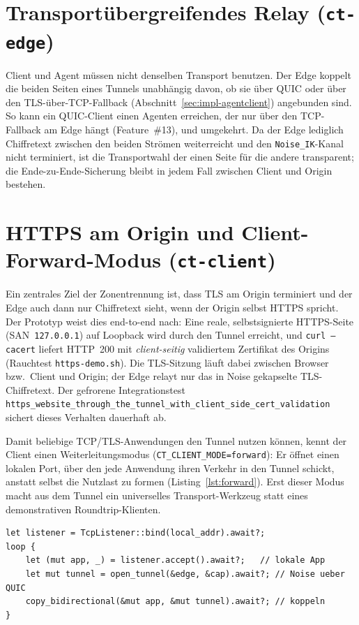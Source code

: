\section{Transportübergreifendes Relay (\texttt{ct-edge})}
\label{sec:impl-crosstransport}

Client und Agent müssen nicht denselben Transport benutzen. Der Edge koppelt
die beiden Seiten eines Tunnels unabhängig davon, ob sie über QUIC oder über
den TLS-über-TCP-Fallback (Abschnitt~\ref{sec:impl-agentclient}) angebunden
sind. So kann ein QUIC-Client einen Agenten erreichen, der nur über den
TCP-Fallback am Edge hängt (Feature~\#13), und umgekehrt. Da der Edge lediglich
Chiffretext zwischen den beiden Strömen weiterreicht und den
\texttt{Noise\_IK}-Kanal nicht terminiert, ist die Transportwahl der einen Seite
für die andere transparent; die Ende-zu-Ende-Sicherung bleibt in jedem Fall
zwischen Client und Origin bestehen.

\section{HTTPS am Origin und Client-Forward-Modus (\texttt{ct-client})}
\label{sec:impl-https}

Ein zentrales Ziel der Zonentrennung ist, dass TLS am Origin terminiert und der
Edge auch dann nur Chiffretext sieht, wenn der Origin selbst HTTPS spricht. Der
Prototyp weist dies end-to-end nach: Eine reale, selbstsignierte HTTPS-Seite
(SAN~\texttt{127.0.0.1}) auf Loopback wird durch den Tunnel erreicht, und
\texttt{curl\ --cacert} liefert HTTP~200 mit \emph{client-seitig} validiertem
Zertifikat des Origins (Rauchtest \texttt{https-demo.sh}). Die TLS-Sitzung
läuft dabei zwischen Browser bzw.\ Client und Origin; der Edge relayt nur das
in Noise gekapselte TLS-Chiffretext. Der gefrorene Integrationstest
\texttt{https\_website\_through\_the\_tunnel\_with\_client\_side\_cert\_validation}
sichert dieses Verhalten dauerhaft ab.

Damit beliebige TCP/TLS-Anwendungen den Tunnel nutzen können, kennt der Client
einen Weiterleitungsmodus (\texttt{CT\_CLIENT\_MODE=forward}): Er öffnet einen
lokalen Port, über den jede Anwendung ihren Verkehr in den Tunnel schickt,
anstatt selbst die Nutzlast zu formen (Listing~\ref{lst:forward}). Erst dieser
Modus macht aus dem Tunnel ein universelles Transport-Werkzeug statt eines
demonstrativen Roundtrip-Klienten.

\begin{lstlisting}[caption={Client-Forward-Modus: lokaler Port in den Tunnel (gekürzt, \texttt{ct-client}).},label={lst:forward}]
let listener = TcpListener::bind(local_addr).await?;
loop {
    let (mut app, _) = listener.accept().await?;   // lokale App
    let mut tunnel = open_tunnel(&edge, &cap).await?; // Noise ueber QUIC
    copy_bidirectional(&mut app, &mut tunnel).await?; // koppeln
}
\end{lstlisting}

